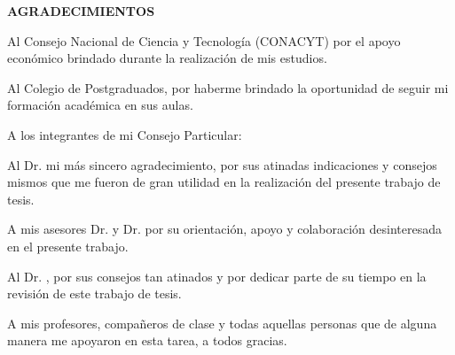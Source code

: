 \newpage
\thispagestyle{plain}

\begin{center}
  \large{\textbf{AGRADECIMIENTOS}}
\end{center}

Al Consejo Nacional de Ciencia y Tecnología (CONACYT) por el apoyo
económico brindado durante la realización de mis estudios.

Al Colegio de Postgraduados, por haberme brindado la oportunidad de seguir
mi formación académica en sus aulas.

A los integrantes de mi Consejo Particular:

Al Dr.  mi más sincero agradecimiento, por sus
atinadas indicaciones y consejos mismos que me fueron de gran utilidad en la
realización del presente trabajo de tesis.

A mis asesores Dr.  y Dr.  por su orientación, apoyo y
colaboración desinteresada en el presente trabajo.

Al Dr. , por sus consejos tan atinados y por dedicar parte de
su tiempo en la revisión de este trabajo de tesis.

A mis profesores, compañeros de clase y todas aquellas personas que de
alguna manera me apoyaron en esta tarea, a todos gracias.

\endinput  
